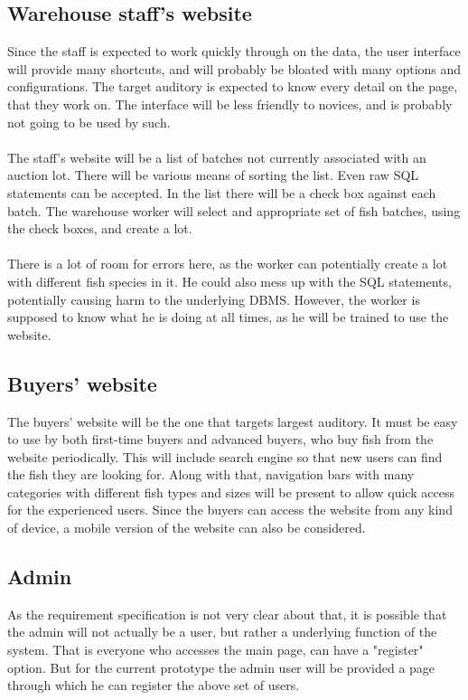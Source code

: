 \documentclass[a4paper]{article}
\begin{document}
\subsection{Warehouse staff's website}
Since the staff is expected to work quickly through on the data, the user interface will provide many shortcuts, and will probably be bloated with many options and configurations. The target auditory is expected to know every detail on the page, that they work on. The interface will be less friendly to novices, and is probably not going to be used by such.\\\\
The staff's website will be a list of batches not currently associated with an auction lot. There will be various means of sorting the list. Even raw SQL statements can be accepted. In the list there will be a check box against each batch. The warehouse worker will select and appropriate set of fish batches, using the check boxes, and create a lot.\\\\ There is a lot of room for errors here, as the worker can potentially create a lot with different fish species in it. He could also mess up with the SQL statements, potentially causing harm to the underlying DBMS.  However, the worker is supposed to know what he is doing at all times, as he will be trained to use the website.
\subsection{Buyers' website}
 The buyers' website will be the one that targets largest auditory. It must be easy to use by both first-time buyers and advanced buyers, who buy fish from the website periodically. This will include search engine so that new users can find the fish they are looking for. Along with that, navigation bars with many categories with different fish types and sizes will be present to allow quick access for the  experienced users. Since the buyers can access the website from any kind of device, a mobile version of the website can also be considered.
\subsection{Admin}
As the requirement specification is not very clear about that, it is possible that the admin will not actually be a user, but rather a underlying function of the system. That is everyone who accesses the main page, can have a "register" option. But for the current prototype the admin user will be provided a page through which he can register the above set of users.
\end{document}
